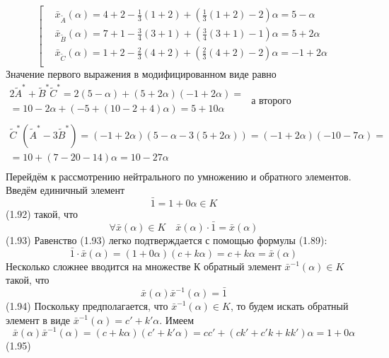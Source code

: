 	\[\left[ \begin{aligned}
  & {{{\bar{x}}}_{{\tilde{A}}}}\left( \alpha  \right)=4+2-\frac{1}{3}\left( 1+2 \right)+\left( \frac{1}{3}\left( 1+2 \right)-2 \right)\alpha =5-\alpha  \\ 
 & {{{\bar{x}}}_{{\tilde{B}}}}\left( \alpha  \right)=7+1-\frac{3}{4}\left( 3+1 \right)+\left( \frac{3}{4}\left( 3+1 \right)-1 \right)\alpha =5+2\alpha  \\ 
 & {{{\bar{x}}}_{{\tilde{C}}}}\left( \alpha  \right)=1+2-\frac{2}{3}\left( 4+2 \right)+\left( \frac{2}{3}\left( 4+2 \right)-2 \right)\alpha =-1+2\alpha  \\ 
\end{aligned} \right.\] 
Значение первого выражения в модифицированном виде равно
	$\begin{matrix}
  2{{{\tilde{A}}}^{*}}+{{{\tilde{B}}}^{*}}{{{\tilde{C}}}^{*}}=2\left( 5-\alpha  \right)+\left( 5+2\alpha  \right)\left( -1+2\alpha  \right)= \\ 
  =10-2\alpha +\left( -5+\left( 10-2+4 \right)\alpha  \right)=5+10\alpha  \\ 
\end{matrix}$
а второго
	\[\begin{matrix}
  {{{\tilde{C}}}^{*}}\left( {{{\tilde{A}}}^{*}}-3{{{\tilde{B}}}^{*}} \right)=\left( -1+2\alpha  \right)\left( 5-\alpha -3\left( 5+2\alpha  \right) \right)=\left( -1+2\alpha  \right)\left( -10-7\alpha  \right)= \\ 
  =10+\left( 7-20-14 \right)\alpha =10-27\alpha  \\ 
\end{matrix}\] 
Перейдём к рассмотрению нейтрального по умножению и обратного элементов. Введём единичный элемент
	\[\bar{1}=1+0\alpha \in K\] 	(1.92)
такой, что 
	\[\forall \bar{x}\left( \alpha  \right)\in K\quad \bar{x}\left( \alpha  \right)\cdot \bar{1}=\bar{x}\left( \alpha  \right)\] 	(1.93)
Равенство (1.93) легко подтверждается с помощью формулы (1.89):
	\[\bar{1}\cdot \bar{x}(\alpha )=(1+0\alpha )(c+k\alpha )=c+k\alpha =\bar{x}(\alpha )\] 
Несколько сложнее вводится на множестве К обратный элемент ${{\bar{x}}^{-1}}\left( \alpha  \right)\in K$ такой, что
	\[\bar{x}\left( \alpha  \right){{\bar{x}}^{-1}}\left( \alpha  \right)=\bar{1}\] 	(1.94)
Поскольку предполагается, что ${{\bar{x}}^{-1}}\left( \alpha  \right)\in K$, то будем искать обратный элемент в виде ${{\bar{x}}^{-1}}\left( \alpha  \right)={c}'+{k}'\alpha $. Имеем
	\[\bar{x}\left( \alpha  \right){{\bar{x}}^{-1}}\left( \alpha  \right)=\left( c+k\alpha  \right)\left( {c}'+{k}'\alpha  \right)=c{c}'+\left( c{k}'+{c}'k+k{k}' \right)\alpha =1+0\alpha \] 	(1.95)
